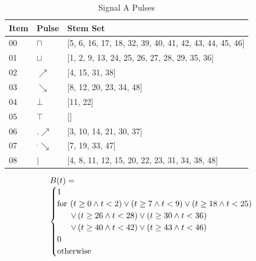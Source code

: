 \documentclass[10pt,journal]{IEEEtran}
\begin{document}
\begin{table}[H] \caption{Signal A Pulses}\centering\begin{tabular}{|p{.4cm}|p{.5cm}|p{6.5cm}|}\hline Item&Pulse &Stem Set\\ \hline 00& \footnotesize$\sqcap$ & \footnotesize[5, 6, 16, 17, 18, 32, 39, 40, 41, 42, 43, 44, 45, 46]\\ \hline 01& \footnotesize$\sqcup$ & \footnotesize[1, 2, 9, 13, 24, 25, 26, 27, 28, 29, 35, 36]\\ \hline 02& \footnotesize$\nearrow$ & \footnotesize[4, 15, 31, 38]\\ \hline 03& \footnotesize$\searrow$ & \footnotesize[8, 12, 20, 23, 34, 48]\\ \hline 04& \footnotesize$\bot$ & \footnotesize[11, 22]\\ \hline 05& \footnotesize$\top$ & \footnotesize[]\\ \hline 06& \footnotesize$.\nearrow$ & \footnotesize[3, 10, 14, 21, 30, 37]\\ \hline 07& \footnotesize$^.\searrow$ & \footnotesize[7, 19, 33, 47]\\ \hline 08& \footnotesize$|$ & \footnotesize[4, 8, 11, 12, 15, 20, 22, 23, 31, 34, 38, 48]\\ \hline \end{tabular} \end{table} 
\begin{equation}
 \begin{minipage}{250pt}
\begin{flushleft} $\displaystyle B{\left(t \right)} = \begin{cases} 1 & \\  \text{for}\: \left(t \geq 0 \wedge t < 2\right) \vee \left(t \geq 7 \wedge t < 9\right) \vee \left(t \geq 18 \wedge t < 25\right) \\ \quad \ \  \vee \left(t \geq 26 \wedge t < 28\right) \vee \left(t \geq 30 \wedge t < 36\right) \\ \quad \ \  \vee \left(t \geq 40 \wedge t < 42\right) \vee \left(t \geq 43 \wedge t < 46\right) \\0 & \\  \text{otherwise} \end{cases}$  \end{flushleft}
 \end{minipage}
 \end{equation}
\end{document}

